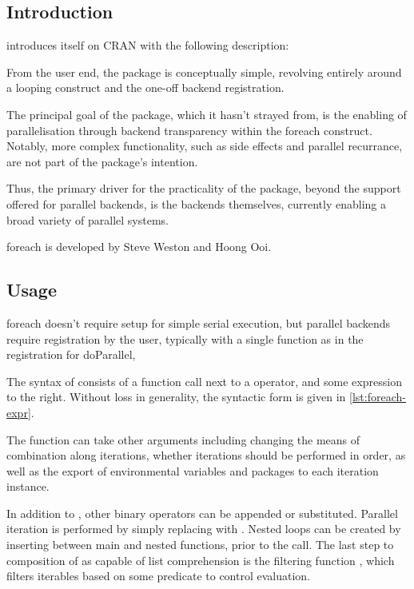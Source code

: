 \subsection{Introduction}\label{sec:foreach-introduction}

 introduces itself on CRAN with the following description:


From the user end, the package is conceptually simple, revolving
entirely around a looping construct and the one-off backend
registration.

The principal goal of the package, which it hasn't strayed from, is the
enabling of parallelisation through backend transparency within the
foreach construct. Notably, more complex functionality, such as side
effects and parallel recurrance, are not part of the package's
intention.

Thus, the primary driver for the practicality of the package, beyond the
support offered for parallel backends, is the backends themselves,
currently enabling a broad variety of parallel systems.

foreach is developed by Steve Weston and Hoong Ooi.

\subsection{Usage}\label{sec:usage}

foreach doesn't require setup for simple serial execution, but parallel
backends require registration by the user, typically with a single
function as in the registration for doParallel, 

The syntax of  consists of a 
 function call next to a  operator, and some expression to the
right\cite{weston19:_using}. Without loss in generality, the syntactic
form is given in \cref{lst:foreach-expr}.


The  function can take other
arguments including changing the means of combination along iterations,
whether iterations should be performed in order, as well as the export
of environmental variables and packages to each iteration instance.

In addition to , other binary operators can be appended
or substituted. Parallel iteration is performed by simply replacing
 with . Nested loops can be created by
inserting  between main and nested  functions,
prior to the  call\cite{weston19:_nestin_loops}. The
last step to composition of  as capable of list comprehension is
the filtering function , which filters iterables based
on some predicate to control evaluation.

